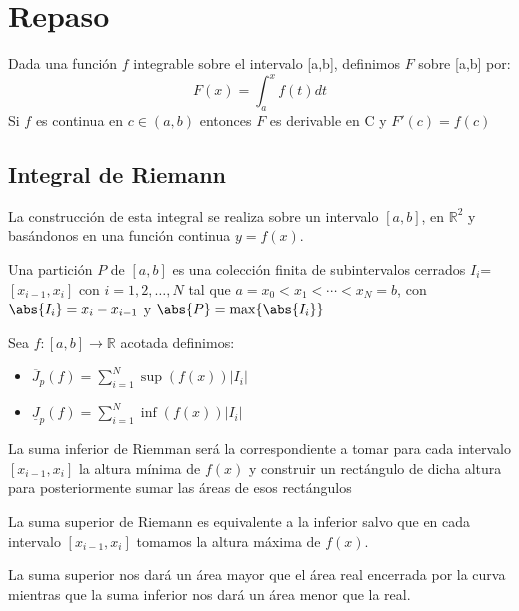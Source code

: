 \documentclass{apuntes}
\begin{document}
\chapter{Repaso}
\begin{theorem}
Dada una función $f$ integrable sobre el intervalo [a,b], definimos $F$ sobre [a,b] por:
\[F(x)=\int_{a}^{x}f(t)dt\]
Si $f$ es continua en $c\in (a,b)$ entonces $F$ es derivable en C y $F'(c)=f(c)$
\end{theorem}

\section{Integral de Riemann}
La construcción de esta integral se realiza sobre un intervalo $[a,b]$, en $\mathbb{R}^2$ y basándonos en una función continua $y=f(x)$.

\begin{defn}[Partición]
Una partición $P$ de $[a,b]$ es una colección finita de subintervalos cerrados $I_i$=$[x_{i-1}, x_i]$ con $i=1,2,\dotsc,N$ tal que $a=x_0<x_1<\cdots < x_N=b$, con $\abs{I_i} = x_i-x_{i-1}$ y $\abs{P} = \max \lbrace \abs{I_i} \rbrace$
\end{defn}


Sea $f:[ a,b ] \rightarrow \mathbb{R}$ acotada definimos:
\begin{itemize}
\item \begin{defn}
$\overline{J}_p(f)=\sum_{i=1}^{N}\sup(f(x))|I_i|$
\end{defn}

\item \begin{defn}
$\underline{J}_p(f)=\sum_{i=1}^{N}\inf(f(x))|I_i|$
\end{defn}
\end{itemize}

La suma inferior de Riemman será la correspondiente a tomar para cada intervalo $[x_{i-1}, x_i]$ la altura mínima de $f(x)$ y construir un rectángulo de dicha altura para posteriormente sumar las áreas de esos rectángulos

La suma superior de Riemann es equivalente a la inferior salvo que en cada intervalo $[x_{i-1}, x_i]$ tomamos la altura máxima de $f(x)$.

La suma superior nos dará un área mayor que el área real encerrada por la curva mientras que la suma inferior nos dará un área menor que la real.
\end{document}

